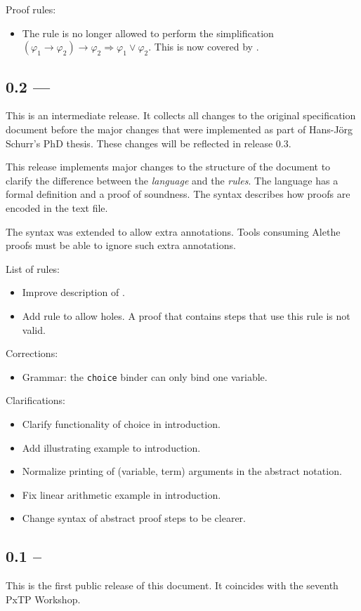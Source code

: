 Proof rules:
\begin{itemize}
  \item The rule  is no longer allowed to
  perform the simplification $(\varphi_1\rightarrow \varphi_2)\rightarrow \varphi_2
  ⇒  \varphi_1\lor \varphi_2$.  This is now covered by .
\end{itemize}

\subsection*{0.2 --- }

This is an intermediate release.  It collects all changes to the original
specification document before the major changes that were implemented as
part of Hans-Jörg Schurr's PhD thesis.   These changes will be reflected
in release 0.3.

This release implements major changes to the structure of the document to
clarify the difference between the \emph{language} and the \emph{rules}.
The language has a formal definition and a proof of soundness.  The syntax
describes how proofs are encoded in the text file.

The syntax was extended to allow extra annotations.  Tools consuming Alethe
proofs must be able to ignore such extra annotations.

List of rules:
\begin{itemize}
    \item Improve description of .
    \item Add {} rule to allow holes.  A proof that contains
    steps that use this rule is not valid.
\end{itemize}
\noindent
Corrections:
\begin{itemize}
    \item Grammar: the \texttt{choice} binder can only bind one variable.
\end{itemize}

\noindent
Clarifications:
\begin{itemize}
    \item Clarify functionality of choice in introduction.
    \item Add illustrating example to introduction.
    \item Normalize printing of (variable, term) arguments in the abstract notation.
    \item Fix linear arithmetic example in introduction.
    \item Change syntax of abstract proof steps to be clearer.
\end{itemize}


\subsection*{0.1 -- }

This is the first public release of this document.  It coincides with
the seventh PxTP Workshop.
